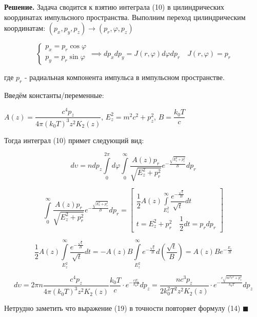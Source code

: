 \documentclass[a4paper, 12pt]{article}
\begin{document}
	\quad \textbf{Решение.} Задача сводится к взятию интеграла (10) в цилиндрических координатах импульсного пространства. Выполним переход цилиндрическим координатам: $(p_x, p_y, p_z) \rightarrow (p_r, \varphi, p_z)$
	
	\begin{equation}
		\begin{cases}
			p_x = p_r \cos\varphi \\
			p_y = p_r \sin\varphi 
		\end{cases} \implies dp_x dp_y = J(r, \varphi) d\varphi dp_r \quad J(r, \varphi) = p_r
	\end{equation}
	
	\begin{center}
		где $p_r$ - радиальная компонента импульса в импульсном пространстве. 
	\end{center}
	
	\quad Введём константы/переменные:
	
	\begin{center}
		$A(z) = \dfrac{c^4 p_z }{4\pi (k_0 T)^3 z^2 K_2 (z)}$, \quad $E_z^2 = m^2 c^2 + p_z^2 $, \quad $B = \dfrac{k_0 T}{c}$
	\end{center}
	
	\quad Тогда интеграл (10) примет следующий вид:
	
	\begin{equation}
		d\upsilon = ndp_z \displaystyle\int\limits_{0}^{2\pi} d\varphi \displaystyle\int\limits_{0}^{\infty} \dfrac{A(z) p_r}{\sqrt{E_z^2 + p_r^2}} e^{-\frac{\sqrt{E_z^2 + p_r^2}}{B}} dp_r 
	\end{equation}
	
	\begin{equation}
		\displaystyle\int\limits_{0}^{\infty} \dfrac{A(z) p_r }{\sqrt{E_z^2 + p_r^2}} e^{-\frac{\sqrt{E_z^2 + p_r^2 }}{B}}dp_r = \left[\begin{array}{c}
			\dfrac{1}{2} A(z) \displaystyle\int\limits_{E_z^2}^{\infty} \dfrac{e^{-\frac{\sqrt{t}}{B}}}{\sqrt{t}} dt \\
			t = E_z^2 + p_r^2 \quad \dfrac{1}{2} dt = p_r dp_r
		\end{array}\right]
	\end{equation}
	
	\begin{equation}
		\dfrac{1}{2} A(z) \displaystyle\int\limits_{E_z^2}^{\infty} \dfrac{e^{-\frac{\sqrt{t}}{B}}}{\sqrt{t}} dt = -A(z) B \displaystyle\int\limits_{E_z^2}^{\infty} e^{-\frac{\sqrt{t}}{B}} d\left(\dfrac{\sqrt{t}}{B}\right) = A(z) B e^{-\frac{E_z}{B}}
	\end{equation}
	
	\begin{equation}
		d\upsilon = 2\pi n \dfrac{c^4 p_z }{4\pi (k_0 T)^3 z^2 K_2 (z)} \dfrac{k_0 T}{c} \cdot e^{-\frac{cE_z}{k_0 T}} dp_z = \dfrac{nc^3 p_z}{2k_0^2 T^2 z^2 K_2 (z) } \cdot e^{-\frac{c\sqrt{m^2 c^2 + p_z^2}}{k_0 T}} dp_z
	\end{equation}
	
	\quad Нетрудно заметить что выражение (19) в точности повторяет формулу (14) $\blacksquare$
\end{document}
